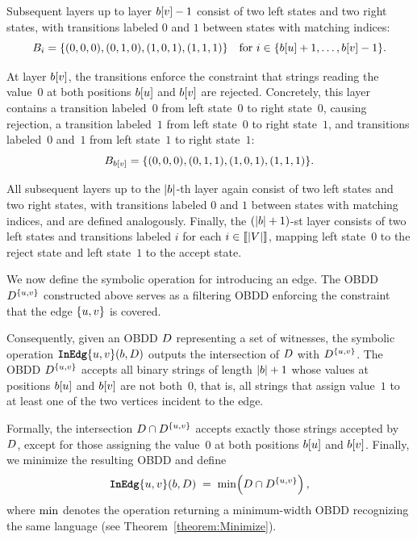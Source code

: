Subsequent layers up to layer $b[v]-1$ consist of two left states and
two right states, with transitions labeled $0$ and $1$ between states with
matching indices:
\[
B_i = \{(0,0,0),(0,1,0),(1,0,1),(1,1,1)\}
\quad\text{for }
i \in \{b[u]+1,\ldots,b[v]-1\}.
\]

At layer $b[v]$, the transitions enforce the constraint that strings
reading the value~$0$ at both positions $b[u]$ and
$b[v]$ are rejected. Concretely, this layer contains a transition
labeled~$0$ from left state~$0$ to right state~$0$, causing rejection, a
transition labeled~$1$ from left state~$0$ to right state~$1$, and transitions
labeled~$0$ and~$1$ from left state~$1$ to right state~$1$:
\[
B_{b[v]}
= \{(0,0,0),(0,1,1),(1,0,1),(1,1,1)\}.
\]

All subsequent layers up to the $|b|$-th layer again consist of two
left states and two right states, with transitions labeled $0$ and $1$ between
states with matching indices, and are defined analogously. Finally, the
$(|b|+1)$-st layer consists of two left states and transitions labeled
$i$ for each $i \in \llbracket |V| \rrbracket$, mapping left state~$0$ to the reject state and
left state~$1$ to the accept state.

We now define the symbolic operation for introducing an edge. The OBDD
$D^{\{u,v\}}$ constructed above serves as a filtering
OBDD enforcing the constraint that the edge $\{u,v\}$ is
covered.

Consequently, given an OBDD $D$ representing a set of witnesses, the symbolic
operation $\texttt{\textbf{InEdg}}\{u,v\}(b,D)$
outputs the intersection of $D$ with $D^{\{u,v\}}$.
The OBDD $D^{\{u,v\}}$ accepts all binary strings of
length $|b|+1$ whose values at positions
$b[u]$ and $b[v]$ are not both~$0$, that is, all strings
that assign value~$1$ to at least one of the two vertices incident to the edge.

Formally, the intersection $D \cap D^{\{u,v\}}$
accepts exactly those strings accepted by $D$, except for those assigning the
value~$0$ at both positions $b[u]$ and $b[v]$. Finally,
we minimize the resulting OBDD and define
\[
\texttt{\textbf{InEdg}}\{u,v\}(b,D)
\;=\;
\mathrm{min}\!\left(D \cap D^{\{u,v\}}\right),
\]
where $\mathrm{min}$ denotes the operation returning a minimum-width OBDD recognizing
the same language (see Theorem~\ref{theorem:Minimize}).



